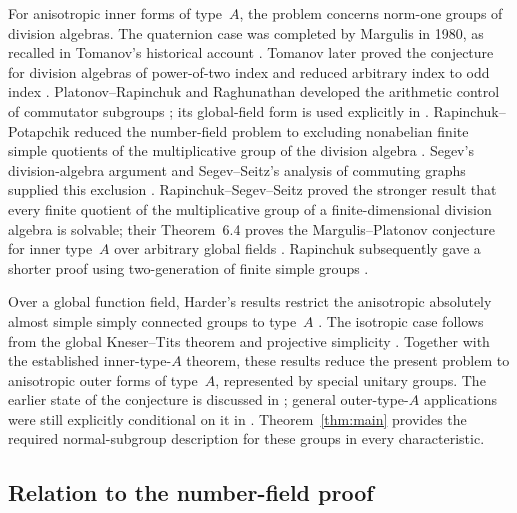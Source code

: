 For anisotropic inner forms of type~$A$, the problem concerns norm-one
groups of division algebras. The quaternion case was completed by
Margulis in 1980, as recalled in Tomanov's historical account
\cite[p.~895]{Tomanov1992}. Tomanov later proved the conjecture for
division algebras of power-of-two index and reduced arbitrary index to
odd index \cite[Theorem and Corollaries~1--2, p.~896]{Tomanov1992}.
Platonov--Rapinchuk and Raghunathan developed
the arithmetic control of commutator subgroups
\cite{PR1984,Raghunathan1988}; its global-field form is used explicitly in
\cite[proof of Theorem~6.4]{RapinchukSegevSeitz2002}.
Rapinchuk--Potapchik reduced the number-field problem to excluding
nonabelian finite simple quotients of the multiplicative group of the
division algebra \cite[Theorem~2.1 and Corollary~2.5]{RapinchukPotapchik1996}.
Segev's division-algebra argument and Segev--Seitz's analysis of commuting
graphs supplied this exclusion
\cite[Theorem~A]{Segev1999}\cite[Theorems~1--3]{SegevSeitz2002}.
Rapinchuk--Segev--Seitz proved the stronger result that every finite quotient
of the multiplicative group of a finite-dimensional division algebra is
solvable; their Theorem~6.4 proves the Margulis--Platonov conjecture for
inner type~$A$ over arbitrary global fields
\cite{RapinchukSegevSeitz2002}.
Rapinchuk subsequently gave a shorter proof using two-generation of finite
simple groups \cite{Rapinchuk2006}.

Over a global function field, Harder's results restrict the anisotropic
absolutely almost simple simply connected groups to type~$A$
\cite{Harder}\cite[p.~914]{PrasadTriality}.
The isotropic case follows from the global Kneser--Tits theorem and
projective simplicity \cite[Theorem~8.1]{Gille}.
Together with the established inner-type-$A$ theorem, these results reduce
the present problem to anisotropic outer forms of type~$A$, represented by
special unitary groups. The earlier state of the conjecture is discussed
in \cite[Section~3.5]{PRsurvey}; general outer-type-$A$ applications were
still explicitly conditional on it in
\cite[Corollary~1.6]{RapinchukTralle2026}.
Theorem~\ref{thm:main} provides the required normal-subgroup description
for these groups in every characteristic.

\subsection{Relation to the number-field proof}

